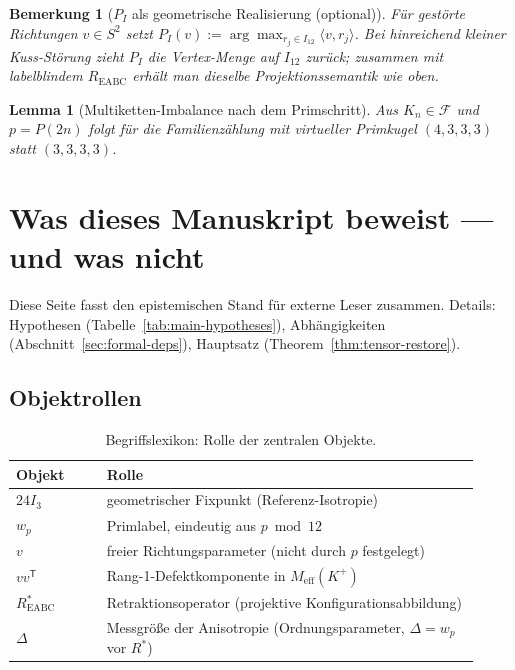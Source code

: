 \documentclass[11pt,a4paper]{article}
\newtheorem{remark}{Bemerkung}
\newtheorem{lemma}{Lemma}
\begin{document}
	\begin{remark}[$P_I$ als geometrische Realisierung (optional)]
		\label{rem:pi-optional}
		Für gestörte Richtungen $v\in S^2$ setzt
		$P_I(v):=\arg\max_{r_j\in I_{12}}\langle v,r_j\rangle$.
		Bei hinreichend kleiner Kuss-Störung zieht $P_I$ die Vertex-Menge auf $I_{12}$
		zurück; zusammen mit labelblindem $R_{\mathrm{EABC}}$ erhält man dieselbe
		Projektionssemantik wie oben.
	\end{remark}
	
	\begin{lemma}[Multiketten-Imbalance nach dem Primschritt]
		\label{lem:prime-imbalance}
		Aus $K_n\in\mathcal{F}$ und $p=P(2n)$ folgt für die Familienzählung mit virtueller
		Primkugel $(4,3,3,3)$ statt $(3,3,3,3)$.
	\end{lemma}
	
	\section{Was dieses Manuskript beweist --- und was nicht}
	\label{sec:what-we-prove}
	
	Diese Seite fasst den epistemischen Stand für externe Leser zusammen.
	Details: Hypothesen (Tabelle~\ref{tab:main-hypotheses}),
	Abhängigkeiten (Abschnitt~\ref{sec:formal-deps}),
	Hauptsatz (Theorem~\ref{thm:tensor-restore}).
	
	\subsection{Objektrollen}
	
	\begin{table}[h!]
		\centering
		\small
		\begin{tabular}{p{0.18\linewidth}p{0.74\linewidth}}
			\hline
			\textbf{Objekt} & \textbf{Rolle} \\
			\hline
			$24I_3$ & geometrischer Fixpunkt (Referenz-Isotropie) \\
			$w_p$ & Primlabel, eindeutig aus $p\bmod 12$ \\
			$v$ & freier Richtungsparameter (nicht durch $p$ festgelegt) \\
			$vv^{\mathsf T}$ & Rang-1-Defektkomponente in $M_{\mathrm{eff}}(K^+)$ \\
			$R^*_{\mathrm{EABC}}$ & Retraktionsoperator (projektive Konfigurationsabbildung) \\
			$\Delta$ & Messgröße der Anisotropie (Ordnungsparameter, $\Delta=w_p$ vor $R^*$) \\
			\hline
		\end{tabular}
		\caption{Begriffslexikon: Rolle der zentralen Objekte.}
		\label{tab:object-roles}
	\end{table}
	
\end{document}
